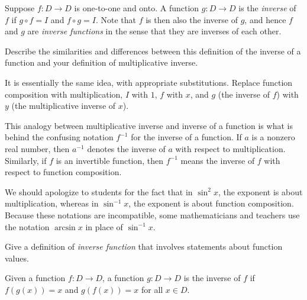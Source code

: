 \documentclass{ximera}
\begin{document}
\begin{definition}
Suppose $f:D\rightarrow D$ is one-to-one and onto.  A function $g:D\rightarrow D$ is the \emph{inverse} of $f$ if $g\circ f = I$ and $f\circ g = I$.  Note that $f$ is then also the inverse of $g$, and hence $f$ and $g$ are \emph{inverse functions} in the sense that they are inverses of each other.  
\end{definition}

\begin{question}
Describe the similarities and differences between this definition of the inverse of a function and your definition of multiplicative inverse.  
\begin{freeResponse}
\begin{hint}
It is essentially the same idea, with appropriate substitutions.  Replace function composition with multiplication, $I$ with $1$, $f$ with $x$, and $g$ (the inverse of $f$) with $y$ (the multiplicative inverse of $x$).  
\end{hint}
\end{freeResponse}
\end{question}

\begin{remark}
This analogy between multiplicative inverse and inverse of a function is what is behind the confusing notation $f^{-1}$ for the inverse of a function.  If $a$ is a nonzero real number, then $a^{-1}$ denotes the inverse of $a$ with respect to multiplication.  Similarly, if $f$ is an invertible function, then $f^{-1}$ means the inverse of $f$ with respect to function composition. 

We should apologize to students for the fact that in $\sin^2 x$, the exponent is about multiplication, whereas in $\sin^{-1} x$, the exponent is about function composition.  Because these notations are incompatible, some mathematicians and teachers use the notation $\arcsin x$ in place of $\sin^{-1} x$.  
\end{remark}

\begin{question}
Give a definition of \emph{inverse function} that involves statements about function values.    
\begin{freeResponse}
\begin{hint}
Given a function $f:D\rightarrow D$, a function $g:D\rightarrow D$ is the inverse of $f$ if $f(g(x)) = x$ and $g(f(x)) = x$ for all $x\in D$.  
\end{hint}
\end{freeResponse}
\end{question}
\end{document}
